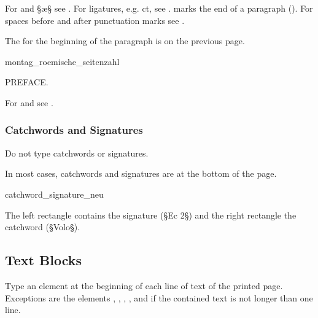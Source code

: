 \begin{crossref}
For and §æ§ see . For ligatures, e.g. { ct}, see .  marks the end of a paragraph (). For spaces before and after punctuation marks see .
\end{crossref}

\begin{note}
The  for the beginning of the paragraph is on the previous page.
\end{note}

\vspace{3mm}
\begin{sampleImage}{montag_roemische_seitenzahl}
\begin{typeLatin}
PREFACE.
\end{typeLatin}
\end{sampleImage}

\begin{crossref}
For  and  see .
\end{crossref}

\subsubsection{Catchwords and Signatures}
\label{section catchwords and signatures}

\begin{mainrule}
Do not type catchwords or signatures.
\end{mainrule}

\begin{clarification}
In most cases, catchwords and signatures are at the bottom of the page.
\end{clarification}

\begin{sampleImage}{catchword_signature_neu}

\notTranscribed

The left rectangle contains the signature (§Ec 2§) and the right rectangle the catchword (§Volo§).
\end{sampleImage}


\tocspace
\subsection{Text Blocks}
\label{textblocks}
\begin{mainrule}
Type an  element at the beginning of each line of text of the printed page. Exceptions are the elements , , , ,  and  if the contained text is not longer than one line.
\end{mainrule}

